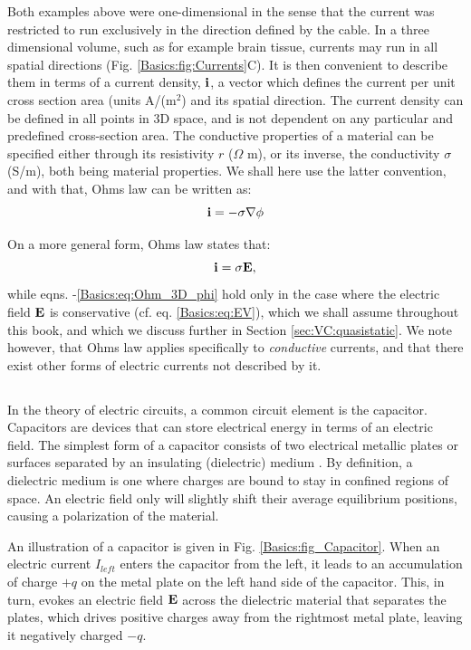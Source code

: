 Both examples above were one-dimensional in the sense that the current was restricted to run exclusively in the direction defined by the cable. In a three dimensional volume, such as for example brain tissue, currents may run in all spatial directions (Fig. \ref{Basics:fig:Currents}C). It is then convenient to describe them in terms of a current density, ${\bf i}$,  a vector which defines the current per unit cross section area (units A/(m$^2$) and its spatial direction. The current density can be defined in all points in 3D space, and is not dependent on any particular and predefined cross-section area. The conductive properties of a material can be specified either through its resistivity $r$ ($\Omega$ m), or its inverse, the conductivity $\sigma$ (S/m), both being material properties. We shall here use the latter convention, and with that, Ohms law can be written as:
\begin{equation}
{\bf i} = - \sigma \nabla \phi
\label{Basics:eq:Ohm_3D_phi}
\end{equation}

On a more general form, Ohms law states that:
\begin{equation}
{\bf i} = \sigma {\bf E}, 
\label{Basics:eq:Ohm_general}
\end{equation}
while eqns. \label{Basics:eq:Ohm_R}-\ref{Basics:eq:Ohm_3D_phi} hold only in the case where the electric field ${\bf E}$ is conservative (cf. eq. \ref{Basics:eq:EV}), which we shall assume throughout this book, and which we discuss further in Section \ref{sec:VC:quasistatic}. We note however, that Ohms law applies specifically to \textit{conductive} currents, and that there exist other forms of electric currents not described by it.


\subsection{}
In the theory of electric circuits, a common circuit element is the capacitor. Capacitors are devices that can store electrical energy in terms of an electric field. The simplest form of a capacitor consists of two electrical metallic plates or surfaces separated by an insulating (dielectric) medium .  By definition, a dielectric medium is one where charges are bound to stay in confined regions of space. An electric field only will slightly shift their average equilibrium positions, causing a polarization of the material.

An illustration of a capacitor is given in Fig. \ref{Basics:fig_Capacitor}. When an electric current $I_{left}$ enters the capacitor from the left, it leads to an accumulation of charge $+q$ on the metal plate on the left hand side of the capacitor. This, in turn, evokes an electric field $\bf E$ across the dielectric material that separates the plates, which drives positive charges away from the rightmost metal plate, leaving it negatively charged $-q$. 

